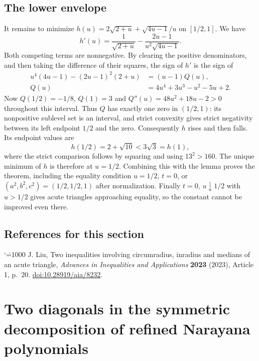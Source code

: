 \documentclass[11pt,a4paper]{article}
\makeatletter
\numberwithin{equation}{section}
\theoremstyle{definition}
\theoremstyle{remark}
\renewenvironment{thebibliography}[1]
 {\subsection*{References for this section}\small
  \list{\@biblabel{\@arabic\c@enumiv}}
       {\settowidth\labelwidth{\@biblabel{#1}}\leftmargin\labelwidth
        \advance\leftmargin\labelsep\@openbib@code
        \usecounter{enumiv}\let\p@enumiv\@empty
        \renewcommand\theenumiv{\@arabic\c@enumiv}}
  \sloppy\clubpenalty4000\widowpenalty4000\sfcode`\.=1000\relax}
 {\def\@noitemerr{\@latex@warning{Empty bibliography}}\endlist}
\makeatother
\begin{document}
\subsection*{The lower envelope}
It remains to minimize $h(u)=2\sqrt{2+u}+\sqrt{4u-1}/u$ on
$[1/2,1]$. We have
\[
 h'(u)=\frac1{\sqrt{2+u}}-\frac{2u-1}{u^2\sqrt{4u-1}} .
\]
Both competing terms are nonnegative. By clearing the positive
denominators, and then taking the difference of their squares, the
sign of $h'$ is the sign of
\begin{align*}
 u^4(4u-1)-(2u-1)^2(2+u)&=(u-1)Q(u),\\
 Q(u)&=4u^4+3u^3-u^2-5u+2.
\end{align*}
Now $Q(1/2)=-1/8$, $Q(1)=3$ and $Q''(u)=48u^2+18u-2>0$ throughout
this interval. Thus $Q$ has exactly one zero in $(1/2,1)$: its
nonpositive sublevel set is an interval, and strict convexity gives
strict negativity between its left endpoint $1/2$ and the zero.
Consequently $h$ rises and then falls. Its endpoint values are
\[
 h(1/2)=2+\sqrt{10}<3\sqrt3=h(1),
\]
where the strict comparison follows by squaring and using $13^2>160$.
The unique minimum of $h$ is therefore at $u=1/2$. Combining this
with the lemma proves the theorem, including the equality condition
$u=1/2$, $t=0$, or $(a^2,b^2,c^2)=(1/2,1/2,1)$ after normalization.
Finally $t=0$, $u\downarrow1/2$ with $u>1/2$ gives acute triangles
approaching equality, so the constant cannot be improved even there.

\begin{thebibliography}{1}
J. Liu, Two inequalities involving circumradius, inradius and medians
of an acute triangle, \textit{Advances in Inequalities and Applications}
\textbf{2023} (2023), Article 1, p.~20.
\href{https://doi.org/10.28919/aia/8232}{doi:10.28919/aia/8232}.
\end{thebibliography}

\par\endgroup

\begingroup
\newcommand{\Nar}{\operatorname{Nar}}
\section{\texorpdfstring{Two diagonals in the symmetric decomposition of refined Narayana polynomials}{Two diagonals in the symmetric decomposition of refined Narayana polynomials}}\label{section:r29keio}
\par\medskip
\end{document}
